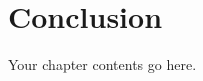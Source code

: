 \documentclass[../../main.tex]{subfiles}
\begin{document}
\chapter*{Conclusion}

Your chapter contents go here. 

\end{document}
